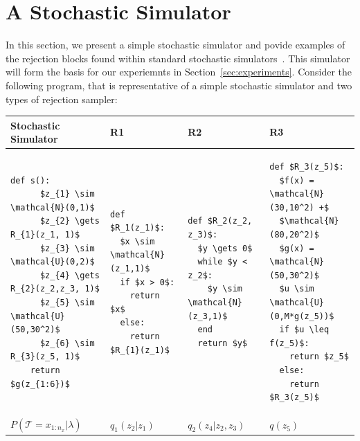\documentclass{article}
\begin{document}

\section{A Stochastic Simulator}

In this section, we present a simple stochastic simulator and povide 
examples of the rejection blocks found within standard stochastic
simulators~\cite{smith2008towards,bershteyn2018implementation, gleisberg2009event}. 
This simulator will form the basis for our experiemnts in Section~\ref{sec:experiments}.
Consider the following program, that is representative of a simple stochastic simulator
and two types of rejection sampler:


\noindent
\begin{tabular}{|p{3.6cm}|p{3.6cm}|p{3.6cm}|p{3.6cm}|}

\hline
Stochastic Simulator  &  R1 & R2 & R3 \\
\hline
\begin{lstlisting}[mathescape=true]
    def s():
      $z_{1} \sim \mathcal{N}(0,1)$
      $z_{2} \gets R_{1}(z_1, 1)$
      $z_{3} \sim \mathcal{U}(0,2)$
      $z_{4} \gets R_{2}(z_2,z_3, 1)$
      $z_{5} \sim \mathcal{U}(50,30^2)$
      $z_{6} \sim R_{3}(z_5, 1)$
    return $g(z_{1:6})$
\end{lstlisting}&
\begin{lstlisting}[mathescape=true]
def $R_1(z_1)$:
  $x \sim \mathcal{N}(z_1,1)$
  if $x > 0$:
    return $x$
  else:
    return $R_{1}(z_1)$
\end{lstlisting}&
\begin{lstlisting}[mathescape=true]
def $R_2(z_2, z_3)$:
  $y \gets 0$
  while $y < z_2$:
    $y \sim \mathcal{N}(z_3,1)$
  end
  return $y$
\end{lstlisting}&
\begin{lstlisting}[mathescape=true]
def $R_3(z_5)$:
  $f(x) = \mathcal{N}(30,10^2) +$
  $\mathcal{N}(80,20^2)$
  $g(x) = \mathcal{N}(50,30^2)$
  $u \sim \mathcal{U}(0,M*g(z_5))$
  if $u \leq f(z_5)$:
    return $z_5$
  else:
    return $R_3(z_5)$
\end{lstlisting}\\
\hline
$P(\mathcal{T}= x_{1:n_x} | \lambda)$ & $q_{1}(z_{2} | z_{1})$ & $q_{2}(z_{4} |z_{2},z_{3})$ & $q(z_5)$ \\
\hline
\end{tabular} 
\end{document}

